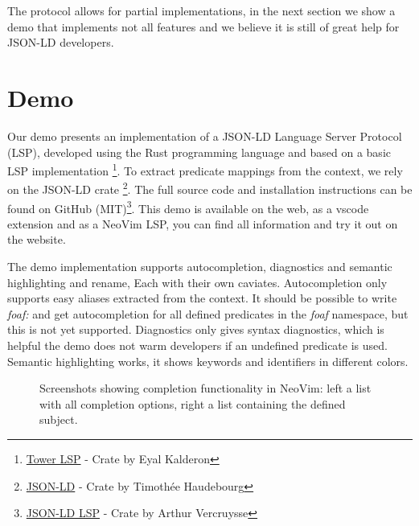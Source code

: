 \documentclass[
]{ceurart}
\begin{document}
The protocol allows for partial implementations, in the next section we show a demo that implements not all features and we believe it is still of great help for JSON-LD developers.

\section{Demo}

Our demo presents an implementation of a JSON-LD Language Server Protocol (LSP), developed using the Rust programming language and based on a basic LSP implementation \footnote{\href{https://crates.io/crates/tower-lsp}{Tower LSP} - Crate by Eyal Kalderon}.
To extract predicate mappings from the context, we rely on the JSON-LD crate \footnote{\href{https://crates.io/crates/json-ld}{JSON-LD} - Crate by Timothée Haudebourg}.
The full source code and installation instructions can be found on GitHub (MIT)\footnote{\href{https://github.com/ajuvercr/jsonld-lsp}{JSON-LD LSP} - Crate by Arthur Vercruysse}.
This demo is available on the web, as a vscode extension and as a NeoVim LSP, you can find all information and try it out on the website. 

The demo implementation supports autocompletion, diagnostics and semantic highlighting and rename, Each with their own caviates. 
Autocompletion only supports easy aliases extracted from the context. 
It should be possible to write \textit{foaf:} and get autocompletion for all defined predicates in the \textit{foaf} namespace, but this is not yet supported.
Diagnostics only gives syntax diagnostics, which is helpful the demo does not warm developers if an undefined predicate is used.
Semantic highlighting works, it shows keywords and identifiers in different colors.


\begin{figure}
\centering
{}
\caption{Screenshots showing completion functionality in NeoVim: left a list with all completion options, right a list containing the defined subject.}
\label{fig:complete}
\end{figure}
\end{document}
